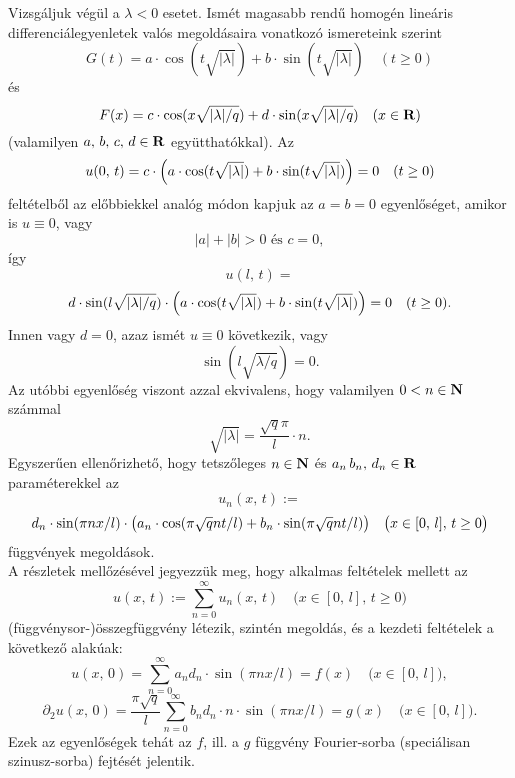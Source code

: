 Vizsgáljuk végül a $\lambda < 0$ esetet. Ismét magasabb rendű homogén lineáris differenciálegyenletek valós megoldásaira vonatkozó ismereteink szerint
\[
	G(t) = a \cdot \cos(t \sqrt{|\lambda|}) + b \cdot \sin(t \sqrt{|\lambda|}) \quad (t \geq 0)
\]
és
\[
	F(x) = c \cdot \cos(x \sqrt{|\lambda| / q}) + d \cdot \sin(x \sqrt{|\lambda| / q}) \quad (x \in \mathbf{R})
\]
(valamilyen $a, \, b, \, c, \, d \in \mathbf{R}$ együtthatókkal). Az
\[
	u(0, \, t) = c \cdot \Big(  a \cdot \cos(t \sqrt{|\lambda|}) + b \cdot \sin(t\sqrt{|\lambda|})  \Big) = 0 \quad ( t \geq 0)
\]
feltételből az előbbiekkel analóg módon kapjuk az $a = b = 0$ egyenlőséget, amikor is $u \equiv 0$, vagy
\[
	|a| + |b| > 0 \text{ és } c = 0,
\]
így
\[
	u(l, \, t) =
\]
\[
	d \cdot \sin(l \sqrt{|\lambda| / q}) \cdot \Big(  a \cdot  \cos(t\sqrt{|\lambda|})  + b \cdot \sin(t \sqrt{|\lambda|}) \Big) = 0 \quad (t \geq 0).
\]
Innen vagy $d = 0$, azaz ismét $u \equiv 0$ következik, vagy
\[
	\sin(l \sqrt{\lambda / q}) = 0.
\]
Az utóbbi egyenlőség viszont azzal ekvivalens, hogy valamilyen $0 < n \in \mathbf{N}$ számmal
\[
	\sqrt{|\lambda|} = \frac{\sqrt{q}\pi}{l}\cdot n.
\]
Egyszerűen ellenőrizhető, hogy tetszőleges $n \in \mathbf{N}$ és $a_n \, b_n, \, d_n \in \mathbf{R}$ paraméterekkel az
\[
	u_n(x, \, t) :=
\]
\[
	d_n \cdot \sin(\pi n x /l) \cdot \big(  a_n \cdot \cos(\pi \sqrt{q} n t / l)  + b_n \cdot \sin(\pi \sqrt{q} n t / l) \big) \quad \big(x \in [0, \, l], \, t \geq 0\big)
\]
függvények megoldások.\\

A részletek mellőzésével jegyezzük meg, hogy alkalmas feltételek mellett az
\[
	u(x, \, t) := \sum_{n=0}^\infty u_n (x, \, t) \quad \big(x \in [0, \, l], \, t \geq 0 \big)
\]
(függvénysor-)összegfüggvény létezik, szintén megoldás, és a kezdeti feltételek a következő alakúak:
\[
	u(x, \, 0) = \sum_{n=0}^\infty a_n d_n \cdot \sin(\pi n x / l) = f(x) \quad \big(x \in [0, \, l]\big),
\]
\[
	\partial_2u(x, \, 0) = \frac{\pi \sqrt{q}}{l} \sum_{n=0}^\infty b_n d_n \cdot n \cdot \sin(\pi n x / l) = g(x) \quad \big(x \in [0, \, l]\big).
\]
Ezek az egyenlőségek tehát az $f$, ill. a $g$ függvény Fourier-sorba (speciálisan szinusz-sorba) fejtését jelentik. 